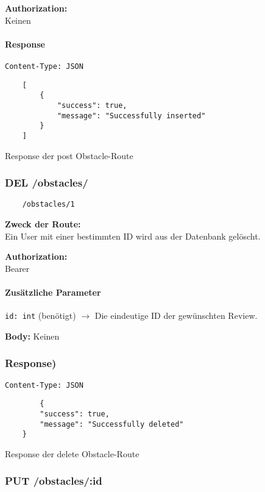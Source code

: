 \textbf{Authorization:} \\
Keinen

\paragraph{Response }
\begin{code}
    \lstinline{Content-Type: JSON}
    \begin{lstlisting}
    [
        {
            "success": true,
            "message": "Successfully inserted"
        }
    ]
    \end{lstlisting}
    \caption{Response der post Obstacle-Route}
\end{code}

\pagebreak


\subsubsection{DEL /obstacles/}

\begin{lstlisting}
    /obstacles/1
\end{lstlisting}

\textbf{Zweck der Route:} \\
Ein User mit einer bestimmten ID wird aus der Datenbank gelöscht.

\textbf{Authorization:} \\
Bearer

\paragraph{Zusätzliche Parameter}
\lstinline{id: int} (benötigt)
$\rightarrow$ Die eindeutige ID der gewünschten Review.

\textbf{Body:}
Keinen


\subsubsection{Response)}
\begin{code}
    \lstinline{Content-Type: JSON}
    \begin{lstlisting}
        {
        "success": true,
        "message": "Successfully deleted"
    }
    \end{lstlisting}
    \caption{Response der delete Obstacle-Route}
\end{code}

\pagebreak


\subsubsection{PUT /obstacles/:id}

